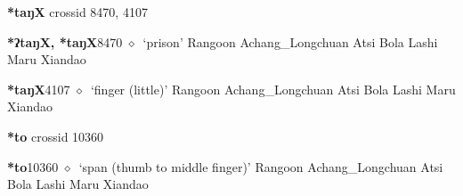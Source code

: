 \item
\textbf{*taŋX}
  {\tiny crossid 8470, 4107}
  \begin{list}{}{\leftmargin=1.5em \itemindent=-1.5em}
  \item {\footnotesize \textbf{*ʔtaŋX, *taŋX}}{\tiny 8470}
         $\diamond$~`prison'
         Rangoon 
\hspace{1ex}
         Achang\_Longchuan 
\hspace{1ex}
         Atsi 
\hspace{1ex}
         Bola 
\hspace{1ex}
         Lashi 
\hspace{1ex}
         Maru 
\hspace{1ex}
         Xiandao 
  \item {\footnotesize \textbf{*taŋX}}{\tiny 4107}
\hspace{1ex}
         $\diamond$~`finger (little)'
         Rangoon 
\hspace{1ex}
         Achang\_Longchuan 
\hspace{1ex}
         Atsi 
\hspace{1ex}
         Bola 
\hspace{1ex}
         Lashi 
\hspace{1ex}
         Maru 
\hspace{1ex}
         Xiandao 
  \end{list}
\item
\textbf{*to}
  {\tiny crossid 10360}
  \begin{list}{}{\leftmargin=1.5em \itemindent=-1.5em}
  \item {\footnotesize \textbf{*to}}{\tiny 10360}
         $\diamond$~`span (thumb to middle finger)'
         Rangoon 
\hspace{1ex}
         Achang\_Longchuan 
\hspace{1ex}
         Atsi 
\hspace{1ex}
         Bola 
\hspace{1ex}
         Lashi 
\hspace{1ex}
         Maru 
\hspace{1ex}
         Xiandao 
  \end{list}
